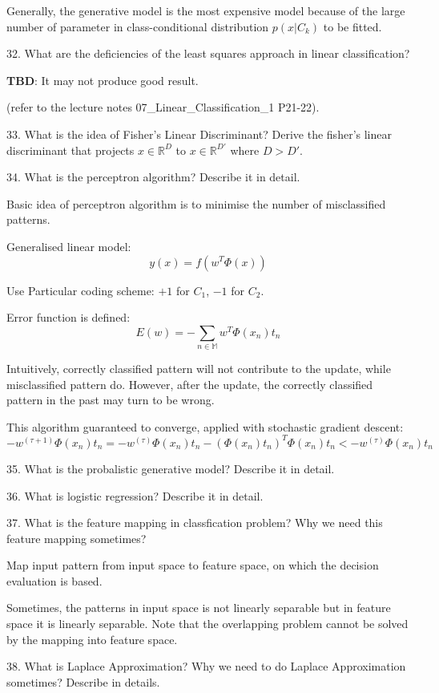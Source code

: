 \documentclass[11pt,a4paper]{article}
\newcommand{\BOLD}[1]{\textbf{#1}}
\begin{document}
    Generally, the generative model is the most expensive model because of the large number of parameter in class-conditional distribution $p(x| C_k)$ to be fitted. 

32. What are the deficiencies of the least squares approach in linear classification? 
    
    \BOLD{TBD}: It may not produce good result. 
    
    (refer to the lecture notes 07\_Linear\_Classification\_1 P21-22).

33. What is the idea of Fisher's Linear Discriminant? Derive the fisher's linear discriminant that projects $x \in \mathbb{R}^D$ to $x \in \mathbb{R}^{D'}$ where $D > D'$.

34. What is the perceptron algorithm? Describe it in detail.

    Basic idea of perceptron algorithm is to minimise the number of misclassified patterns.

    Generalised linear model:
    $$ y(x) = f( w^T \Phi(x) )$$

    Use Particular coding scheme: $+1$ for $C_1$, $-1$ for $C_2$.

    Error function is defined: 
    $$ E(w) = - \sum_{n\in \mathbb{M}} w^T \Phi(x_n) t_n $$

    Intuitively, correctly classified pattern will not contribute to the update, while misclassified pattern do. However, after the update, the correctly classified pattern in the past may turn to be wrong. 

    This algorithm guaranteed to converge, applied with stochastic gradient descent:
    $$ - w^{(\tau + 1)} \Phi(x_n) t_n = - w^{(\tau)} \Phi(x_n) t_n - (\Phi(x_n) t_n)^T \Phi(x_n) t_n < - w^{(\tau)} \Phi(x_n) t_n $$


35. What is the probalistic generative model? Describe it in detail.

36. What is logistic regression? Describe it in detail.

37. What is the feature mapping in classfication problem? Why we need this feature mapping sometimes?

    Map input pattern from input space to feature space, on which the decision evaluation is based. 

    Sometimes, the patterns in input space is not linearly separable but in feature space it is linearly separable. Note that the overlapping problem cannot be solved by the mapping into feature space.

38. What is Laplace Approximation? Why we need to do Laplace Approximation sometimes? Describe in details. 
\end{document}
